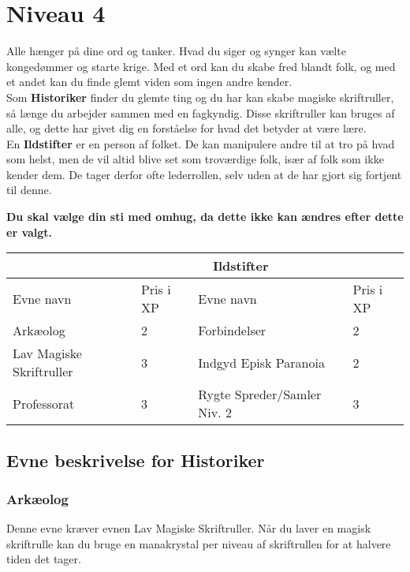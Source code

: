 \chapter*{Niveau 4}
Alle hænger på dine ord og tanker. Hvad du siger og synger kan vælte kongedømmer og starte krige. Med et ord kan du skabe fred blandt folk, og med et andet kan du finde glemt viden som ingen andre kender.\\
Som \textbf{Historiker} finder du glemte ting og du har kan skabe magiske skriftruller, så længe du arbejder sammen med en fagkyndig. Disse skriftruller kan bruges af alle, og dette har givet dig en forståelse for hvad det betyder at være lære.\\
En \textbf{Ildstifter} er en person af folket. De kan manipulere andre til at tro på hvad som helst, men de vil altid blive set som troværdige folk, især af folk som ikke kender dem. De tager derfor ofte lederrollen, selv uden at de har gjort sig fortjent til denne.

\textbf{Du skal vælge din sti med omhug, da dette ikke kan ændres efter dette er valgt.}\\


\begin{tabular}{|p{}|p{}|p{}|p{}|}
\hline
\rowcolor{cerulean!80}
 \multicolumn{2}{|c|}{ Historiker } & \multicolumn{2}{|c|}{ Ildstifter }\\
\hline
\rowcolor{cerulean!40}
    Evne navn & Pris i XP & Evne navn & Pris i XP\\ \hline
    Arkæolog & 2 & Forbindelser & 2\\\hline
    Lav Magiske Skriftruller & 3 & Indgyd Episk Paranoia& 2\\\hline
    Professorat & 3 & Rygte Spreder/Samler Niv. 2& 3\\\hline
\end{tabular}

\section*{Evne beskrivelse for Historiker}

\subsection*{Arkæolog}
Denne evne kræver evnen Lav Magiske Skriftruller. Når du laver en magisk skriftrulle kan du bruge en manakrystal per niveau af skriftrullen for at halvere tiden det tager. 


